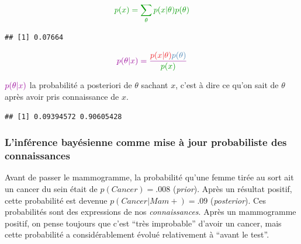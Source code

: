 \documentclass[
  a4paper,11pt,twoside,onecolumn,openright,final,oldfontcommands]{memoir}
\newenvironment{Shaded}{\begin{snugshade}}{\end{snugshade}}
\newcommand{\KeywordTok}[1]{\textcolor[rgb]{0.13,0.29,0.53}{\textbf{#1}}}
\newcommand{\NormalTok}[1]{#1}
\newcommand{\OperatorTok}[1]{\textcolor[rgb]{0.81,0.36,0.00}{\textbf{#1}}}
\newcommand{\StringTok}[1]{\textcolor[rgb]{0.31,0.60,0.02}{#1}}
\theoremstyle{definition}
\theoremstyle{definition}
\theoremstyle{definition}
\theoremstyle{remark}
\begin{document}
\[\color{green}{p(x)=\sum\limits_{\theta}p(x|\theta)p(\theta)}\]

\begin{Shaded}
\end{Shaded}

\begin{verbatim}
## [1] 0.07664
\end{verbatim}

\[
\color{purple}{p(\theta \vert x)} = \dfrac{\color{orangered}{p(x\vert \theta)} \color{steelblue}{p(\theta)}}{\color{green}{p(x)}}
\]

\(\color{purple}{p(\theta \vert x)}\) { la probabilité a posteriori de \(\theta\) sachant \(x\), c'est à dire ce qu'on sait de \(\theta\) après avoir pris connaissance de \(x\).}

\begin{Shaded}
\end{Shaded}

\begin{verbatim}
## [1] 0.09394572 0.90605428
\end{verbatim}

\hypertarget{linfuxe9rence-bayuxe9sienne-comme-mise-uxe0-jour-probabiliste-des-connaissances}{%
\subsubsection{L'inférence bayésienne comme mise à jour probabiliste des connaissances}\label{linfuxe9rence-bayuxe9sienne-comme-mise-uxe0-jour-probabiliste-des-connaissances}}

Avant de passer le mammogramme, la probabilité qu'une femme tirée au sort ait un cancer du sein était de \(p(Cancer)=.008\) (\emph{prior}). Après un résultat positif, cette probabilité est devenue \(p(Cancer|Mam+)=.09\) (\emph{posterior}). Ces probabilités sont des expressions de nos \emph{connaissances}. Après un mammogramme positif, on pense toujours que c'est ``très improbable'' d'avoir un cancer, mais cette probabilité a considérablement évolué relativement à ``avant le test''.
\end{document}
